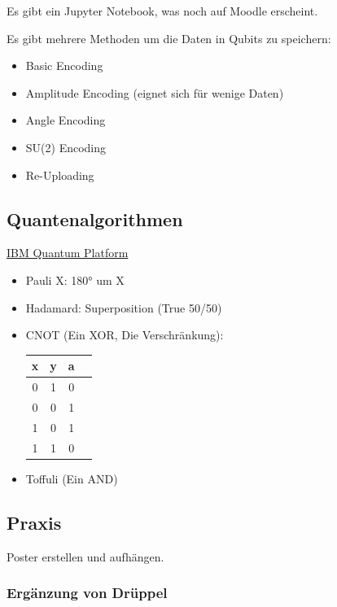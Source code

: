 \documentclass[a4paper]{article}
\begin{document}
Es gibt ein Jupyter Notebook, was noch auf Moodle erscheint.

Es gibt mehrere Methoden um die Daten in Qubits zu speichern:

\begin{itemize}
    \item Basic Encoding
    \item Amplitude Encoding (eignet sich für wenige Daten)
    \item Angle Encoding
    \item SU(2) Encoding
    \item Re-Uploading
\end{itemize}

\subsection{Quantenalgorithmen}

\href{https://quantum.cloud.ibm.com/composer}{IBM Quantum Platform}

\begin{itemize}
    \item Pauli X: 180° um X
    \item Hadamard: Superposition (True 50/50)
    \item CNOT (Ein XOR, Die Verschränkung): 
    \begin{center}
        \begin{tabular}{c|c|cc}
            x & y & a & \\
            \hline
            0 & 1 & 0 & \\
            0 & 0 & 1 & \\
            1 & 0 & 1 & \\
            1 & 1 & 0 & \\
        \end{tabular}
    \end{center}
    \item Toffuli (Ein AND)
\end{itemize}

\subsection{Praxis}

Poster erstellen und aufhängen.

\subsubsection*{Ergänzung von Drüppel}
\end{document}
